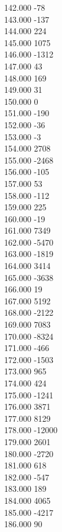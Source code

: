 { 142.000	-78 \\
 143.000	-137 \\
 144.000	224 \\
 145.000	1075 \\
 146.000	-1312 \\
 147.000	43 \\
 148.000	169 \\
 149.000	31 \\
 150.000	0 \\
 151.000	-190 \\
 152.000	-36 \\
 153.000	-3 \\
 154.000	2708 \\
 155.000	-2468 \\
 156.000	-105 \\
 157.000	53 \\
 158.000	-112 \\
 159.000	225 \\
 160.000	-19 \\
 161.000	7349 \\
 162.000	-5470 \\
 163.000	-1819 \\
 164.000	3414 \\
 165.000	-3638 \\
 166.000	19 \\
 167.000	5192 \\
 168.000	-2122 \\
 169.000	7083 \\
 170.000	-8324 \\
 171.000	-466 \\
 172.000	-1503 \\
 173.000	965 \\
 174.000	424 \\
 175.000	-1241 \\
 176.000	3871 \\
 177.000	8129 \\
 178.000	-12000 \\
 179.000	2601 \\
 180.000	-2720 \\
 181.000	618 \\
 182.000	-547 \\
 183.000	189 \\
 184.000	4065 \\
 185.000	-4217 \\
 186.000	90 \\
}
